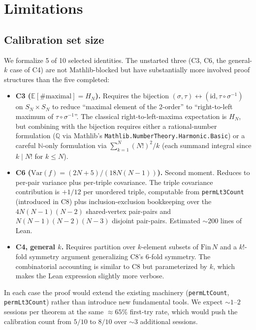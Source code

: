 \documentclass[11pt]{article}
\theoremstyle{definition}
\begin{document}
\section{Limitations}\label{sec:limitations}

\subsection{Calibration set size}

We formalize 5 of 10 selected identities. The unstarted three (C3, C6, the
general-$k$ case of C4) are not Mathlib-blocked but have substantially more
involved proof structures than the five completed:

\begin{itemize}
    \item \textbf{C3 ($\mathbb{E}[\#\text{maximal}] = H_N$).} Requires the
    bijection $(\sigma, \tau) \leftrightarrow (\mathrm{id}, \tau \circ \sigma^{-1})$
    on $S_N \times S_N$ to reduce ``maximal element of the 2-order'' to
    ``right-to-left maximum of $\tau \circ \sigma^{-1}$''. The classical
    right-to-left-maxima expectation is $H_N$, but combining with the bijection
    requires either a rational-number formulation ($\mathbb{Q}$ via Mathlib's
    \texttt{Mathlib.NumberTheory.Harmonic.Basic}) or a careful $\mathbb{N}$-only
    formulation via $\sum_{k=1}^{N} (N!)^2/k$ (each summand integral since
    $k \mid N!$ for $k \le N$).

    \item \textbf{C6 ($\mathrm{Var}(f) = (2N+5)/(18N(N-1))$).} Second moment.
    Reduces to per-pair variance plus per-triple covariance. The triple
    covariance contribution is $+1/12$ per unordered triple, computable from
    \texttt{permLt3Count} (introduced in C8) plus inclusion-exclusion bookkeeping
    over the $4N(N-1)(N-2)$ shared-vertex pair-pairs and $N(N-1)(N-2)(N-3)$
    disjoint pair-pairs. Estimated $\sim 200$ lines of Lean.

    \item \textbf{C4, general $k$.} Requires partition over $k$-element subsets
    of $\mathrm{Fin}\,N$ and a $k!$-fold symmetry argument generalizing C8's
    6-fold symmetry. The combinatorial accounting is similar to C8 but
    parameterized by $k$, which makes the Lean expression slightly more verbose.
\end{itemize}

In each case the proof would extend the existing machinery
(\texttt{permLtCount}, \texttt{permLt3Count}) rather than introduce new
fundamental tools. We expect $\sim 1$--$2$ sessions per theorem at the same
$\approx 65\%$ first-try rate, which would push the calibration count from
$5/10$ to $8/10$ over $\sim 3$ additional sessions.
\end{document}
